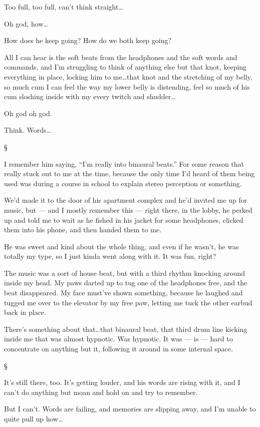 \documentclass[12pt,letterpaper,oneside]{memoir}
\newcommand\secdiv{
  \begin{center}
    \S
  \end{center}
}
\begin{document}
  Too full, too full, can't think straight\ldots{}

  Oh god, how\ldots{}

  How does he keep going? How do we both keep going?

  All I can hear is the soft beats from the headphones and the soft words and commands, and I'm struggling to think of anything else but that knot, keeping everything in place, locking him to me\ldots{}that knot and the stretching of my belly, so much cum I can feel the way my lower belly is distending, feel so much of his cum sloshing inside with my every twitch and shudder\ldots{}

  Oh god oh god.

  Think. Words\ldots{}

  \secdiv

  I remember him saying, ``I'm really into binaural beats.'' For some reason that really stuck out to me at the time, because the only time I'd heard of them being used was during a course in school to explain stereo perception or something.

  We'd made it to the door of his apartment complex and he'd invited me up for music, but --- and I mostly remember this --- right there, in the lobby, he perked up and told me to wait as he fished in his jacket for some headphones, clicked them into his phone, and then handed them to me.

  He was sweet and kind about the whole thing, and even if he wasn't, he was totally my type, so I just kinda went along with it. It was fun, right?

  The music was a sort of house beat, but with a third rhythm knocking around inside my head. My paws darted up to tug one of the headphones free, and the beat disappeared. My face must've shown something, because he laughed and tugged me over to the elevator by my free paw, letting me tuck the other earbud back in place.

  There's something about that\ldots{}that binaural beat, that third drum line kicking inside me that was almost hypnotic. Was hypnotic. It was --- is --- hard to concentrate on anything but it, following it around in some internal space.

  \secdiv

  It's still there, too. It's getting louder, and his words are rising with it, and I can't do anything but moan and hold on and try to remember.

  But I can't. Words are failing, and memories are slipping away, and I'm unable to quite pull up how\ldots{}
\end{document}
